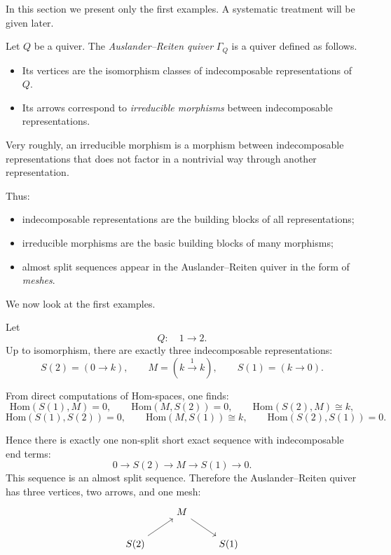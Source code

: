 \documentclass[11pt, a4paper]{report}
\newcommand{\Hom}{\mathrm{Hom}}
\begin{document}
In this section we present only the first examples. A systematic treatment will be
given later.

Let $Q$ be a quiver. The \emph{Auslander--Reiten quiver} $\Gamma_Q$ is a quiver
defined as follows.

\begin{itemize}
    \item Its vertices are the isomorphism classes of indecomposable
          representations of $Q$.
    \item Its arrows correspond to \emph{irreducible morphisms} between
          indecomposable representations.
\end{itemize}

Very roughly, an irreducible morphism is a morphism between indecomposable
representations that does not factor in a nontrivial way through another
representation.

Thus:
\begin{itemize}
    \item indecomposable representations are the building blocks of all
          representations;
    \item irreducible morphisms are the basic building blocks of many morphisms;
    \item almost split sequences appear in the Auslander--Reiten quiver in the
          form of \emph{meshes}.
\end{itemize}

\medskip

We now look at the first examples.

Let
\[
    Q:\quad 1 \longrightarrow 2.
\]
Up to isomorphism, there are exactly three indecomposable representations:
\[
    S(2)=
    \left(
    0 \longrightarrow k
    \right),
    \qquad
    M=
    \left(
    k \xrightarrow{1} k
    \right),
    \qquad
    S(1)=
    \left(
    k \longrightarrow 0
    \right).
\]

From direct computations of Hom-spaces, one finds:
\[
    \Hom(S(1),M)=0,\qquad \Hom(M,S(2))=0,\qquad \Hom(S(2),M)\cong k,
\]
\[
    \Hom(S(1),S(2))=0,\qquad \Hom(M,S(1))\cong k,\qquad \Hom(S(2),S(1))=0.
\]

Hence there is exactly one non-split short exact sequence with indecomposable end
terms:
\[
    0 \longrightarrow S(2) \longrightarrow M \longrightarrow S(1) \longrightarrow 0.
\]
This sequence is an almost split sequence. Therefore the Auslander--Reiten quiver
has three vertices, two arrows, and one mesh:
\[
    \begin{tikzcd}
        & M \arrow[rd] &      \\
        S(2) \arrow[ru] &              & S(1)
    \end{tikzcd}
\]
\end{document}
